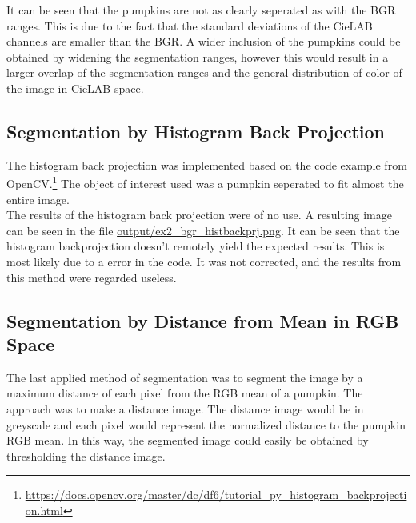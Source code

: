 \documentclass[../Head/Main.tex]{subfiles}
\begin{document}
It can be seen that the pumpkins are not as clearly seperated as with the BGR ranges. This is due to the fact that the standard deviations of the CieLAB channels are smaller than the BGR. A wider inclusion of the pumpkins could be obtained by widening the segmentation ranges, however this would result in a larger overlap of the segmentation ranges and the general distribution of color of the image in CieLAB space.

\subsection{Segmentation by Histogram Back Projection}
The histogram back projection was implemented based on the code example from OpenCV.\footnote{\url{https://docs.opencv.org/master/dc/df6/tutorial_py_histogram_backprojection.html}} The object of interest used was a pumpkin seperated to fit almost the entire image.\\
The results of the histogram back projection were of no use. A resulting image can be seen in the file \url{output/ex2_bgr_histbackprj.png}. It can be seen that the histogram backprojection doesn't remotely yield the expected results. This is most likely due to a error in the code. It was not corrected, and the results from this method were regarded useless.

\subsection{Segmentation by Distance from Mean in RGB Space}
The last applied method of segmentation was to segment the image by a maximum distance of each pixel from the RGB mean of a pumpkin. The approach was to make a distance image. The distance image would be in greyscale and each pixel would represent the normalized distance to the pumpkin RGB mean. In this way, the segmented image could easily be obtained by thresholding the distance image.
\end{document}
